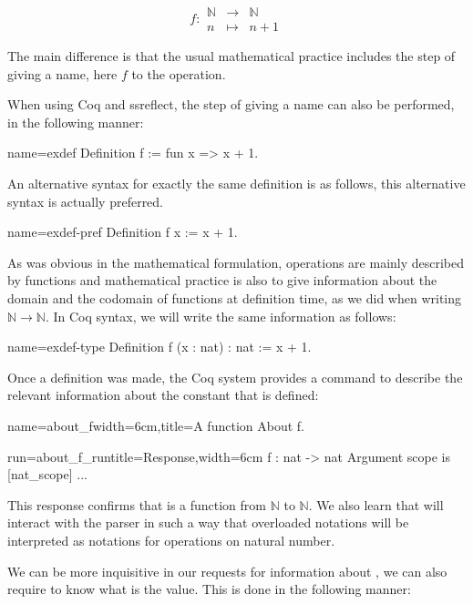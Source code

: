 \[f : 
\begin{array}{ccc}
{\mathbb{N}} &\rightarrow& {\mathbb{N}}\\
n &\mapsto& n + 1
\end{array}\]

The main difference is that the usual mathematical practice includes
the step of giving a name, here \(f\) to the operation.

When using Coq and ssreflect, the step of giving a name can also be
performed, in the following manner:

\begin{coq}{name=exdef}{}
Definition f := fun x => x + 1.
\end{coq}
An alternative syntax for exactly the same definition is as follows,
this alternative syntax is actually preferred.

\begin{coq}{name=exdef-pref}{}
Definition f x := x + 1.
\end{coq}
As was obvious in the mathematical formulation, operations are mainly
described by functions and mathematical practice is also to give
information about the domain and the codomain of functions at
definition time, as we did when writing
\({\mathbb{N}}\rightarrow{\mathbb{N}}\).  In Coq syntax, we will write
the same information as follows:

\begin{coq}{name=exdef-type}{}
Definition f (x : nat) : nat := x + 1.
\end{coq}

Once a definition was made, the Coq system provides a command to
describe the relevant information about the constant that is defined:

\begin{coq}{name=about_f}{width=6cm,title=A function}
About f.
\end{coq}
\begin{coqout}{run=about_f_run}{title=Response,width=6cm}
f : nat -> nat
Argument scope is [nat_scope] ...
\end{coqout}
This response confirms that  is a function from
\({\mathbb{N}}\) to \({\mathbb{N}}\).  We also learn that  
will interact with the parser in such a way that overloaded notations
will be interpreted as notations for operations on natural number.

We can be more inquisitive in our requests for information about
, we can also require to know what is the value.  This is done in
the following manner:


